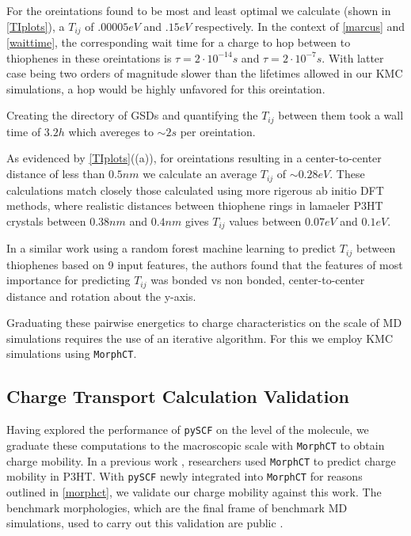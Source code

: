 For the oreintations found to be most and least optimal we calculate (shown in \autoref{TIplots}),
a $T_{ij}$ of $.00005eV$ and $.15eV$ respectively. In the context of \autoref{marcus} and \autoref{waittime},
the corresponding wait time for a charge to hop between to thiophenes in these oreintations is $\tau = 2
\cdot 10^{-14}s$ and $\tau = 2 \cdot 10^{-7}s$. With latter case being two orders of magnitude slower than the
lifetimes allowed in our KMC simulations, a hop would be highly unfavored for this oreintation. 

Creating the directory of GSDs and quantifying the $T_{ij}$ between them took a wall time of $3.2h$ which
avereges to ${\sim}2s$ per oreintation. 

As evidenced by \autoref{TIplots}((a)), for oreintations resulting in a center-to-center distance of less than
$0.5nm$ we calculate an average $T_{ij}$ of ${\sim} 0.28eV$.  
These calculations match closely those
calculated using more rigerous ab initio DFT methods\cite{Lan2008},
where realistic distances between thiophene rings in lamaeler P3HT crystals 
between $0.38nm$ and $0.4 nm$ gives $T_{ij}$ values between $0.07eV$ and $0.1eV$. 

In a similar work using a random forest machine learning to predict $T_{ij}$
between thiophenes based on 9 input features, the authors found that the
features of most importance for predicting $T_{ij}$ was bonded vs non bonded,
center-to-center distance and rotation about the y-axis. \cite{Jankowski2019c}

Graduating these pairwise energetics to charge characteristics on the scale of MD simulations
requires the use of an iterative algorithm. For this we employ KMC simulations using \texttt{MorphCT}.

\subsection{Charge Transport Calculation Validation}

Having explored the performance of \texttt{pySCF} on the level of the molecule, we graduate these computations to the
macroscopic scale with \texttt{MorphCT} to obtain charge mobility.
In a previous work \cite{Miller2018}, researchers used \texttt{MorphCT} to predict charge mobility in P3HT. 
With \texttt{pySCF} newly integrated into \texttt{MorphCT} for reasons outlined in \autoref{morphct},
we validate our charge mobility against this work.
The benchmark morphologies, which are the final frame of benchmark MD simulations,
used to carry out this validation are public \cite{P3HTData}. 

